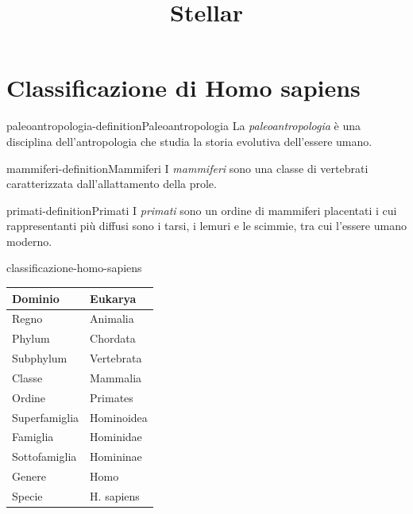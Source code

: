 \documentclass[preview]{standalone}
\begin{document}
\title{Stellar}
\genpage

\section{Classificazione di Homo sapiens}

\begin{snippetdefinition}{paleoantropologia-definition}{Paleoantropologia}
    La \textit{paleoantropologia} è una disciplina dell'antropologia che studia la storia evolutiva
    dell'essere umano.
\end{snippetdefinition}

\begin{snippetdefinition}{mammiferi-definition}{Mammiferi}
    I \textit{mammiferi} sono una classe di vertebrati caratterizzata dall'allattamento della prole. 
\end{snippetdefinition}

\begin{snippetdefinition}{primati-definition}{Primati}
    I \textit{primati} sono un ordine di mammiferi placentati i cui rappresentanti
    più diffusi sono i tarsi, i lemuri e le scimmie, tra cui l'essere umano moderno. 
\end{snippetdefinition}


\begin{snippet}{classificazione-homo-sapiens}
    \vspace{0.25cm}
    \begin{center}
        \begin{tabular}{|l|l|}
            \hline Dominio & Eukarya \\
            \hline Regno & Animalia \\
            \hline Phylum & Chordata \\
            \hline Subphylum & Vertebrata \\
            \hline Classe & Mammalia \\
            \hline Ordine & Primates \\
            \hline Superfamiglia & Hominoidea \\
            \hline Famiglia & Hominidae \\
            \hline Sottofamiglia & Homininae \\
            \hline Genere & Homo \\
            \hline Specie & H. sapiens \\
            \hline
        \end{tabular}
    \end{center}
    \vspace{0.25cm}
\end{snippet}
\end{document}
